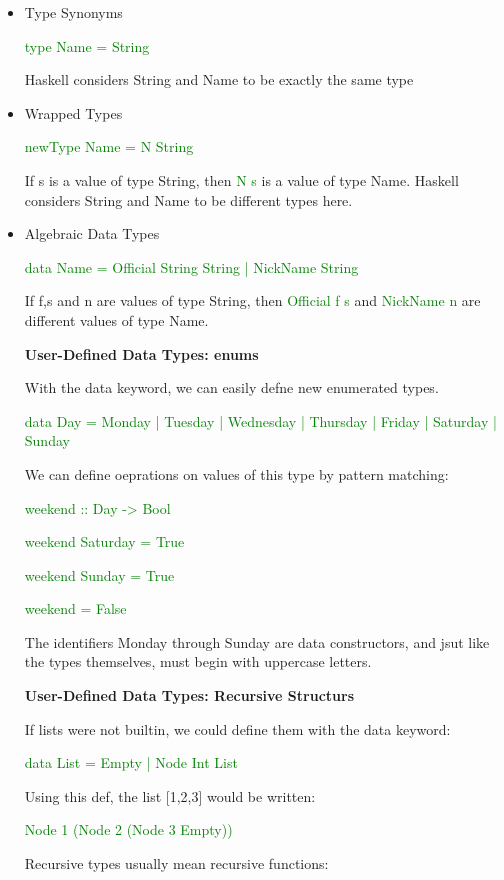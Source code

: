 \documentclass{article}
\begin{document}
\begin{itemize}
\item Type Synonyms

\textcolor{green}{type Name = String}

Haskell considers String and Name to be exactly the same type
\item Wrapped Types

\textcolor{green}{newType Name = N String}

If s is a value of type String, then \textcolor{green}{N  s} is a value of type Name. Haskell considers String and Name to be different types here.
\item Algebraic Data Types

\textcolor{green}{data Name = Official String String  |  NickName String}

If f,s and n are values of type String, then \textcolor{green}{Official  f  s} and \textcolor{green}{NickName  n} are different values of type Name.


\textbf{User-Defined Data Types: enums}

With the data keyword, we can easily defne new enumerated types.

\textcolor{green}{data Day = Monday | Tuesday | Wednesday | Thursday | Friday | Saturday | Sunday}

We can define oeprations on values of this type by pattern matching:

\textcolor{green}{weekend  ::  Day -> Bool}

\textcolor{green}{weekend  Saturday = True}

\textcolor{green}{weekend Sunday  = True}

\textcolor{green}{weekend \textunderscore = False}

The identifiers Monday through Sunday are data constructors, and jsut like the types themselves, must begin with uppercase letters.


\textbf{User-Defined Data Types: Recursive Structurs}

If lists were not builtin, we could define them with the data keyword:

\textcolor{green}{data List = Empty}
\textcolor{green}{|  Node Int List}

Using this def, the list [1,2,3] would be written:

\textcolor{green}{Node  1  (Node  2  (Node  3  Empty))}

Recursive types usually mean recursive functions:


\end{itemize}
\end{document}
